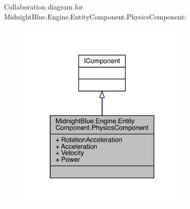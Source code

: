 Collaboration diagram for Midnight\+Blue.\+Engine.\+Entity\+Component.\+Physics\+Component\+:
\nopagebreak
\begin{figure}[H]
\begin{center}
\leavevmode
\includegraphics[width=237pt]{class_midnight_blue_1_1_engine_1_1_entity_component_1_1_physics_component__coll__graph}
\end{center}
\end{figure}

